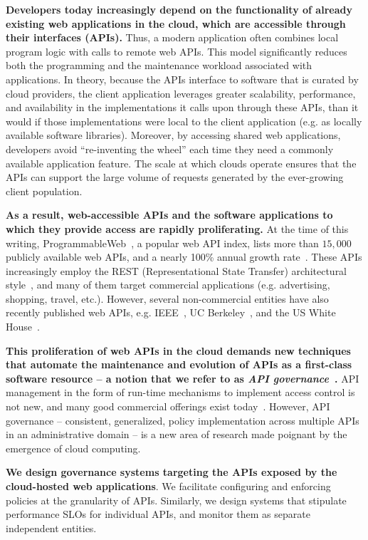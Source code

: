 \textbf{Developers today
increasingly depend on the functionality of already existing web applications in the cloud, which
are accessible through their interfaces (APIs).} Thus, a modern application 
often combines local program logic with calls to remote web APIs. 
This model significantly reduces both the programming and
the maintenance workload associated with applications. In theory, because
the APIs interface to software that is curated by cloud providers, the client
application leverages greater scalability, performance, 
and availability in the implementations it calls upon through these APIs, than
it would if those implementations were local to the client application
(e.g. as locally available software libraries).
Moreover, by accessing shared web applications, developers avoid ``re-inventing the
wheel'' each time they need a commonly available application feature. The scale at
which clouds operate ensures that the APIs can support the large volume
of requests generated by the ever-growing client population.

\textbf{As a result, web-accessible APIs and the software applications to which
they provide access are rapidly proliferating.} At the time of this writing, 
ProgrammableWeb~\cite{pweb}, a popular web API index, lists more than $15,000$
publicly available web APIs, and a nearly 100\% annual growth rate~\cite{pweb_growth}.
These APIs increasingly employ the REST (Representational State Transfer) architectural style~\cite{Fielding:2000:ASD:932295}, and 
many of them target commercial applications (e.g. advertising, shopping, travel, etc.).
However, several non-commercial entities have also recently published web 
APIs, e.g. IEEE~\cite{ieeeapis}, UC Berkeley~\cite{ucbapis}, and the US White
House~\cite{whitehouseapis}. 

\textbf{This proliferation of web APIs in the cloud demands new techniques that
automate the maintenance and evolution of APIs as a first-class software
resource -- a notion that we refer to as \textit{API governance}~\cite{6903538}.} 
API management in the form of run-time mechanisms to implement
access control is not new, and many good commercial offerings exist today~\cite{3scale,apigee,layer7}.   
However, API governance -- consistent, generalized, policy
implementation across multiple APIs in an administrative domain --
is a new area of research made poignant by the emergence of cloud computing.

\textbf{We design governance systems targeting the APIs exposed by the cloud-hosted
web applications}. We facilitate configuring and enforcing policies at
the granularity of APIs. Similarly, we design systems that stipulate performance SLOs 
for individual APIs, and monitor them as separate independent entities.